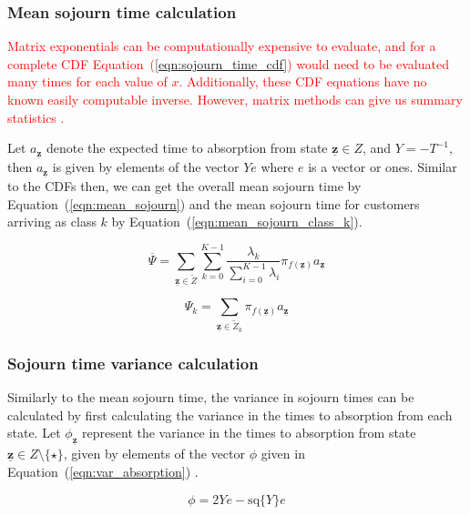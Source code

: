\documentclass{article}
\begin{document}
\subsubsection{Mean sojourn time calculation}\label{sec:meansojourncalc}
\textcolor{red}{Matrix exponentials can be computationally expensive to
evaluate, and for a complete CDF Equation~(\ref{eqn:sojourn_time_cdf}) would
need to be evaluated many times for each value of $x$.
Additionally, these CDF equations have no known easily computable inverse.
However, matrix methods can give us summary statistics \cite{stewart09}.}

Let $a_{\underline{\mathbf{z}}}$ denote the expected time to absorption
from state $\underline{\mathbf{z}} \in Z$, and $Y = -T^{-1}$, then
$a_{\underline{\mathbf{z}}}$ is
given by elements of the vector $Ye$ where $e$ is a vector or ones.
Similar to the CDFs then, we can get the overall mean sojourn time by
Equation~(\ref{eqn:mean_sojourn}) and the mean sojourn time for customers
arriving as class $k$ by Equation~(\ref{eqn:mean_sojourn_class_k}).

\begin{equation}\label{eqn:mean_sojourn}
\overline{\Psi} = \sum_{\underline{\mathbf{z}} \in \tilde{Z}} \sum_{k=0}^{K-1} \frac{\lambda_k}{\sum_{i=0}^{K-1} \lambda_i} \pi_{f(\underline{\mathbf{z}})} a_{\underline{\mathbf{z}}}
\end{equation}

\begin{equation}\label{eqn:mean_sojourn_class_k}
\Psi_k = \sum_{\underline{\mathbf{z}} \in \tilde{Z}_k} \pi_{f(\underline{\mathbf{z}})} a_{\underline{\mathbf{z}}}
\end{equation}


\subsubsection{Sojourn time variance calculation}\label{sec:varsojourncalc}
Similarly to the mean sojourn time, the variance in sojourn times can be
calculated by first calculating the variance in the times to absorption from
each state. Let $\phi_{\underline{\mathbf{z}}}$ represent the variance in the
times to absorption from state $\underline{\mathbf{z}} \in Z\setminus\{\star\}$,
given by elements of the vector $\phi$ given in
Equation~(\ref{eqn:var_absorption}) \cite{stewart09}.

\begin{equation}\label{eqn:var_absorption}
\phi = 2Ye - \text{sq}\{Y\}e
\end{equation}
\end{document}
